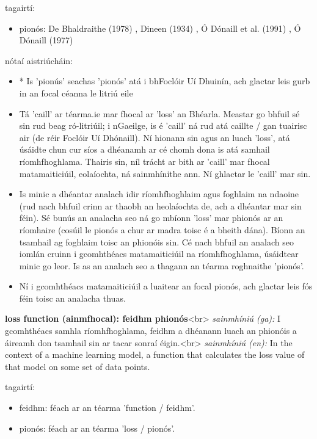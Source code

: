 \documentclass{article}
\begin{document}
tagairtí:
\begin{itemize}
	\item pionós: De Bhaldraithe (1978) \cite{de-bhaldraithe}, Dineen (1934) \cite{dineen}, Ó Dónaill et al. (1991) \cite{focloir-beag}, Ó Dónaill (1977) \cite{odonaill}
\end{itemize}

nótaí aistriúcháin:
\begin{itemize}
	\item * Is 'pionús' seachas 'pionós' atá i bhFoclóir Uí Dhuinín, ach glactar leis gurb in an focal céanna le litriú eile
	\item Tá 'caill' ar téarma.ie mar fhocal ar 'loss' an Bhéarla. Meastar go bhfuil sé sin rud beag ró-litriúil; i nGaeilge, is é 'caill' ná rud atá caillte / gan tuairisc air (de réir Foclóir Uí Dhónaill). Ní hionann sin agus an luach 'loss', atá úsáidte chun cur síos a dhéanamh ar cé chomh dona is atá samhail ríomhfhoghlama. Thairis sin, níl trácht ar bith ar 'caill' mar fhocal matamaiticiúil, eolaíochta, ná sainmhínithe ann. Ní ghlactar le 'caill' mar sin.
	\item Is minic a dhéantar analach idir ríomhfhoghlaim agus foghlaim na ndaoine (rud nach bhfuil crinn ar thaobh an heolaíochta de, ach a dhéantar mar sin féin). Sé bunús an analacha seo ná go mbíonn 'loss' mar phionós ar an ríomhaire (cosúil le pionós a chur ar madra toisc é a bheith dána). Bíonn an tsamhail ag foghlaim toisc an phionóis sin. Cé nach bhfuil an analach seo iomlán cruinn i gcomhthéacs matamaiticiúil na ríomhfhoghlama, úsáidtear minic go leor. Is as an analach seo a thagann an téarma roghnaithe 'pionós'.
	\item Ní i gcomhthéacs matamaiticiúil a luaitear an focal pionós, ach glactar leis fós féin toisc an analacha thuas.
\end{itemize}


\textbf{loss function (ainmfhocal): feidhm phionós}<br>
\textit{sainmhíniú (ga):} I gcomhthéacs samhla ríomhfhoghlama, feidhm a dhéanann luach an phionóis a áireamh don tsamhail sin ar tacar sonraí éigin.<br>
\textit{sainmhíniú (en):} In the context of a machine learning model, a function that calculates the loss value of that model on some set of data points.

tagairtí:
\begin{itemize}
	\item feidhm: féach ar an téarma 'function / feidhm'.
	\item pionós: féach ar an téarma 'loss / pionós'.
\end{itemize}
\end{document}
